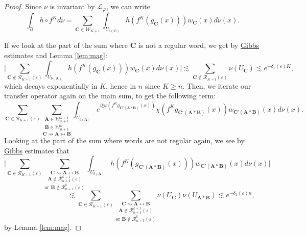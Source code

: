 \documentclass[a4paper]{article}
\theoremstyle{definition}
\begin{document}
\begin{proof}

Since $\nu$ is invariant by $\mathcal{L}_\varphi$, we can write 
$$ \int_{\mathcal{U}} h \circ f^K d \nu = \sum_{\mathbf{C} \in \mathcal{W}_{K+1}}  \int_{U_{b(\mathbf{C})}} h\left(f^K(g_{ \mathbf{C}}(x))\right) w_{\mathbf{C}}(x) d\nu(x) .$$
 
If we look at the part of the sum where $\mathbf{C}$ is not a regular word, we get by \hyperref[Gibbs]{Gibbs} estimates and Lemma \ref{lem:mag}:
$$ \Bigg| \sum_{\mathbf{C} \notin \mathcal{R}_{K+1}(\varepsilon)} \int_{U_{b(\mathbf{A})}} h\left(f^K(g_{\mathbf{C}}(x))\right) w_{\mathbf{C}}(x) d\nu(x) \Bigg| \lesssim \sum_{\mathbf{C} \notin \mathcal{R}_{K+1}(\varepsilon)} \nu(U_{\mathbf{C}}) \lesssim e^{-\delta_1(\varepsilon) K}, $$
which decays exponentially in $K$, hence in $n$ since $K \geq n$.
Then, we iterate our transfer operator again on the main sum, to get the following term:
$$  \sum_{\mathbf{C} \in \mathcal{R}_{K+1}(\varepsilon)} \underset{\mathbf{C} \rightsquigarrow \mathbf{A} \leftrightarrow \mathbf{B}}{ \underset{ \mathbf{B} \in \mathcal{W}_{n+1}^k}{ \underset{\mathbf{A} \in \mathcal{W}_{n+1}^{k+1} }{ \sum}} } \int_{U_{b(\mathbf{A})}} e^{i \xi \psi( f^K g_{\mathbf{C}'(\mathbf{A} * \mathbf{B})}(x))}  \chi(f^K g_{\mathbf{C}'(\mathbf{A} * \mathbf{B})}(x))  w_{\mathbf{C}'(\mathbf{A} * \mathbf{B})}(x)d\nu(x) . $$
Looking at the part of the sum where words are not regular again, we see by \hyperref[Gibbs]{Gibbs} estimates that
$$ \Bigg| \sum_{\mathbf{C} \in \mathcal{R}_{K+1}(\varepsilon)} \underset{\text{or }\mathbf{B} \notin \mathcal{R}_{n+1}^k(\varepsilon)}{\underset{\mathbf{A} \notin \mathcal{R}_{n+1}^{k+1}(\varepsilon) }{\sum_{\mathbf{C} \rightsquigarrow \mathbf{A} \leftrightarrow \mathbf{B}}}} \int_{U_{b(\mathbf{A})}} h\left(f^K(g_{\mathbf{C}'(\mathbf{A} * \mathbf{B})}(x))\right) w_{\mathbf{C}' (\mathbf{A} * \mathbf{B})}(x) d\nu(x) \Bigg| \quad \quad  \quad \quad  \quad \quad  \quad \quad  \quad \quad $$ $$  \quad \quad  \quad \quad  \quad \quad  \quad \quad  \lesssim \sum_{\mathbf{C} \in \mathcal{R}_{K+1}(\varepsilon)} \underset{\text{or }\mathbf{B} \notin \mathcal{R}_{n+1}^k(\varepsilon)}{\underset{\mathbf{A} \notin \mathcal{R}_{n+1}^{k+1}(\varepsilon) }{\sum_{\mathbf{C} \rightsquigarrow \mathbf{A} \leftrightarrow \mathbf{B}}}} \nu(U_{\mathbf{C}}) \nu(U_{\mathbf{A} * \mathbf{B}}) \lesssim e^{-\delta_1(\varepsilon)n}, $$
by Lemma \ref{lem:mag}. \end{proof}
\end{document}
